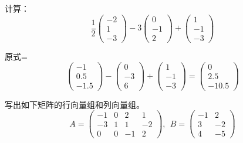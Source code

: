 \documentclass[a4paper]{report}
\begin{document}
\EX 计算：
\begin{equation*}
\frac{1}{2}
\begin{pmatrix}
-2\\ 1\\ -3
\end{pmatrix}-3
\begin{pmatrix}
0\\ -1\\ 2
\end{pmatrix}+
\begin{pmatrix}
1\\ -1\\ -3
\end{pmatrix}
\end{equation*}

\begin{jie}
原式=
\begin{equation*}
\begin{pmatrix}
-1\\ 0.5\\ -1.5
\end{pmatrix}-
\begin{pmatrix}
0\\ -3\\ 6
\end{pmatrix}+
\begin{pmatrix}
1\\ -1\\ -3
\end{pmatrix}=\begin{pmatrix}
0\\ 2.5\\ -10.5
\end{pmatrix}
\end{equation*}
\end{jie}

\EX 写出如下矩阵的行向量组和列向量组。
\begin{equation*}
A=
\begin{pmatrix}
-1 &0&2&1\\ -3& 1&1&-2\\ 0&0&-1&2
\end{pmatrix},~~B=
\begin{pmatrix}
-1&2\\ 3&-2\\ 4&-5
\end{pmatrix}
\end{equation*}
\end{document}
